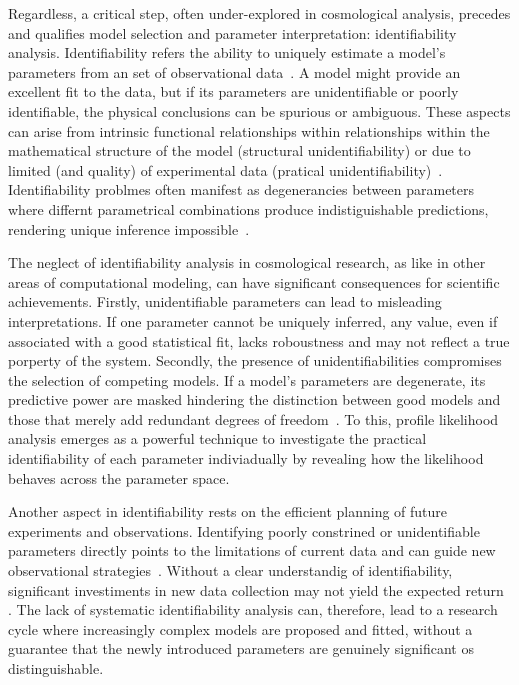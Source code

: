 \documentclass[final,3p,times]{elsarticle}
\begin{document}
Regardless, a critical step, often under-explored in cosmological analysis, precedes and qualifies model selection and parameter interpretation: identifiability analysis.
Identifiability refers the ability to uniquely estimate a model's parameters from an set of observational data~\cite{WalterPronzato1997,Raue2009}. A model might provide an excellent fit to the data, but if its parameters are unidentifiable or poorly identifiable, the physical conclusions can be spurious or ambiguous.
These aspects can arise from intrinsic functional relationships within relationships within the mathematical structure of the model (structural unidentifiability) or due to limited (and quality) of experimental data (pratical unidentifiability)~\cite{CobelliDiStefano1980, Raue2009}.
Identifiability problmes often manifest as degenerancies between parameters where differnt parametrical combinations produce indistiguishable predictions, rendering unique inference impossible~\cite{Hines2014_example}.

The neglect of identifiability analysis in cosmological research, as like in other areas of computational modeling, can have significant consequences for scientific achievements. Firstly, unidentifiable parameters can lead to misleading interpretations. If one parameter cannot be uniquely inferred, any value, even if associated with a good statistical fit, lacks roboustness and may not reflect a true porperty of the system.
Secondly, the presence of unidentifiabilities compromises the selection of competing models. If a model's parameters are degenerate, its predictive power are masked hindering the distinction between good models and those that merely add redundant degrees of freedom~\cite{Raue2009}. To this, profile likelihood analysis emerges as a powerful technique to investigate the practical identifiability of each parameter indiviadually by revealing how the likelihood behaves across the parameter space.

Another aspect in identifiability rests on the efficient planning of future experiments and observations. Identifying poorly constrined or unidentifiable parameters directly points to the limitations of current data and can guide new observational strategies~\cite{VillaescusaNavarro2020_example}.
Without a clear understandig of identifiability, significant investiments in new data collection may not yield the expected return . The lack of systematic identifiability analysis can, therefore, lead to a research cycle where increasingly complex models are proposed and fitted, without a guarantee that the newly introduced parameters are genuinely significant os distinguishable.
\end{document}
